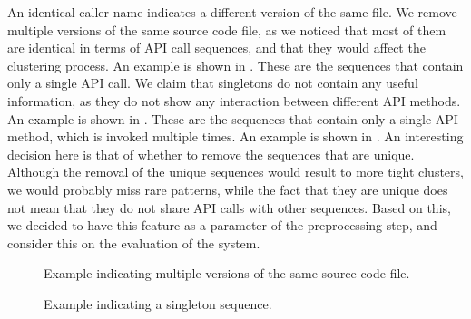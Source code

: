 \begin{itemize}
 An identical caller name indicates a different version of the same file. We remove multiple versions of the same source code file, as we noticed that most of them are identical in terms of API call sequences, and that they would affect the clustering process. An example is shown in .
 These are the sequences that contain only a single API call. We claim that singletons do not contain any useful information, as they do not show any interaction between different API methods. An example is shown in .
 These are the sequences that contain only a single API method, which is invoked multiple times. An example is shown in .
 An interesting decision here is that of whether to remove the sequences that are unique. Although the removal of the unique sequences would result to more tight clusters, we would probably miss rare patterns, while the fact that they are unique does not mean that they do not share API calls with other sequences. Based on this, we decided to have this feature as a parameter of the preprocessing step, and consider this on the evaluation of the system.
\end{itemize}

\begin{figure}[ht]

\vspace{-10pt}
\caption[Example indicating multiple versions of the same source code file]{Example indicating multiple versions of the same source code file.}
\label{listings:versions}
\vspace{-5pt}
\end{figure}

\begin{figure}[ht]
\vspace{-10pt}

\vspace{-10pt}
\caption[Example indicating a singleton sequence]{Example indicating a singleton sequence.}
\label{listings:singleton}
\vspace{-5pt}
\end{figure}

